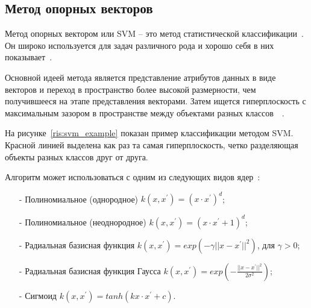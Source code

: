 \subsection{Метод опорных векторов}
Метод опорных вектором или SVM -- это метод статистической классификации~\cite{сristianini}. Он широко используется для задач различного рода и хорошо себя в них показывает~\cite{crammer}.
\par
Основной идеей метода является представление атрибутов данных в виде векторов и переход в пространство более высокой размерности, чем получившееся на этапе представления векторами. Затем ищется гиперплоскость с максимальным зазором в пространстве между объектами разных классов~\cite{rashka}~\cite{statnikov}.
\par
На рисунке~\ref{ris:svm_example} показан пример классификации методом SVM. Красной линией выделена как раз та самая гиперплоскость, четко разделяющая объекты разных классов друг от друга.
\\
\par
Алгоритм может использоваться с одним из следующих видов ядер~\cite{crammer}:
\begin{itemize}
	\item[-] Полиномиальное (однородное) $k(x,x^{'}) = (x \cdot x^{'})^{d}$;
	\item[-] Полиномиальное (неоднородное) $k(x,x^{'}) = (x \cdot x^{'} + 1)^{d}$;
	\item[-] Радиальная базисная функция $k(x,x^{'}) = exp(-\gamma ||x - x^{'}||^{2})$, для $\gamma > 0$;
	\item[-] Радиальная базисная функция Гаусса $k(x,x^{'}) = exp\left ( -\frac{||x - x^{'}||^{2}}{2\sigma^{2}} \right )$;
	\item[-] Сигмоид $k(x,x^{'}) = tanh(kx\cdot x^{'} + c)$.
\end{itemize}
